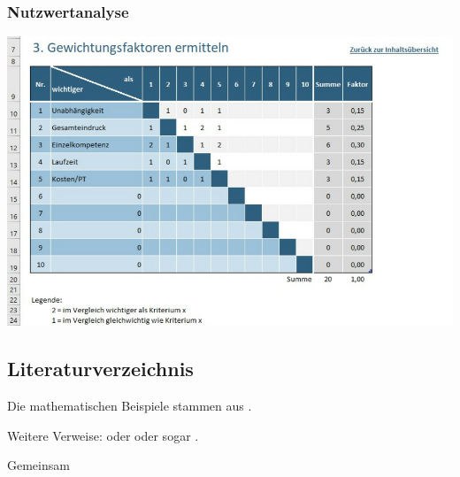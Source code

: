 \documentclass{article}
\begin{document}
\subsubsection{Nutzwertanalyse}
\begin{center}
	\centering
	\includegraphics[scale=0.2]{nutz}
	\label{fig:nutz}
\end{center}


\subsection{Literaturverzeichnis}
Die mathematischen Beispiele stammen aus \autocite{Graham1995}.

Weitere Verweise: \parencite{Graham1995} oder \textcite{Thomas2008} oder sogar
.

\autocite[56]{Thomas2008}

\autocite[Siehe][45-48]{Graham1995}

Gemeinsam \autocite{Graham1995,Thomas2008}

\printbibliography
\end{document}
